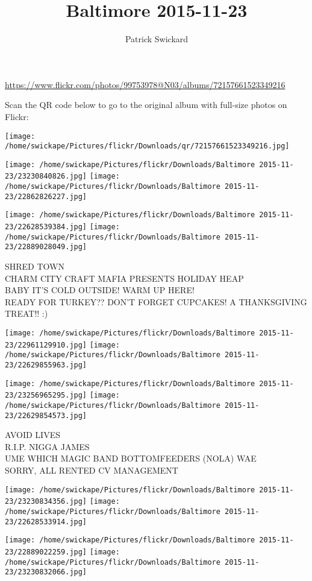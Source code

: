 \documentclass[10pt,letterpaper]{article}
\title{Baltimore 2015-11-23}
\author{Patrick Swickard}
\date{}
\begin{document}
\maketitle

\url{https://www.flickr.com/photos/99753978@N03/albums/72157661523349216}

Scan the QR code below to go to the original album with full-size photos on Flickr:

\texttt{[image: /home/swickape/Pictures/flickr/Downloads/qr/72157661523349216.jpg]}
\pagebreak

\texttt{[image: /home/swickape/Pictures/flickr/Downloads/Baltimore 2015-11-23/23230840826.jpg]}
\texttt{[image: /home/swickape/Pictures/flickr/Downloads/Baltimore 2015-11-23/22862826227.jpg]}

\texttt{[image: /home/swickape/Pictures/flickr/Downloads/Baltimore 2015-11-23/22628539384.jpg]}
\texttt{[image: /home/swickape/Pictures/flickr/Downloads/Baltimore 2015-11-23/22889028049.jpg]}

SHRED TOWN\\
CHARM CITY CRAFT MAFIA PRESENTS HOLIDAY HEAP\\
BABY IT'S COLD OUTSIDE!  WARM UP HERE!\\
READY FOR TURKEY??  DON'T FORGET CUPCAKES!  A THANKSGIVING TREAT!! :)
\pagebreak

\texttt{[image: /home/swickape/Pictures/flickr/Downloads/Baltimore 2015-11-23/22961129910.jpg]}
\texttt{[image: /home/swickape/Pictures/flickr/Downloads/Baltimore 2015-11-23/22629855963.jpg]}

\texttt{[image: /home/swickape/Pictures/flickr/Downloads/Baltimore 2015-11-23/23256965295.jpg]}
\texttt{[image: /home/swickape/Pictures/flickr/Downloads/Baltimore 2015-11-23/22629854573.jpg]}

AVOID LIVES\\
R.I.P. NIGGA JAMES\\
UME WHICH MAGIC BAND BOTTOMFEEDERS (NOLA) WAE\\
SORRY, ALL RENTED CV MANAGEMENT
\pagebreak

\texttt{[image: /home/swickape/Pictures/flickr/Downloads/Baltimore 2015-11-23/23230834356.jpg]}
\texttt{[image: /home/swickape/Pictures/flickr/Downloads/Baltimore 2015-11-23/22628533914.jpg]}

\texttt{[image: /home/swickape/Pictures/flickr/Downloads/Baltimore 2015-11-23/22889022259.jpg]}
\texttt{[image: /home/swickape/Pictures/flickr/Downloads/Baltimore 2015-11-23/23230832066.jpg]}
\end{document}
